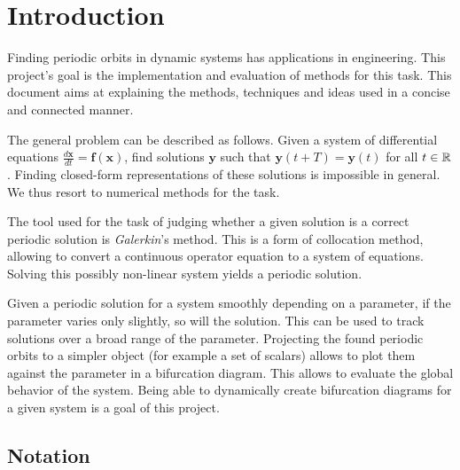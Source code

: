 \section{Introduction}


Finding periodic orbits in dynamic systems has applications in engineering. %
This project's goal is the implementation and evaluation of methods for this task.
This document aims at explaining the methods, techniques and ideas used in a concise and connected manner.

The general problem can be described as follows.
Given a system of differential equations $\frac{d \mathbf x}{dt} = \mathbf f(\mathbf x)$, find solutions $\mathbf y$ such that $\mathbf y(t+T) = \mathbf y(t)$ for all $t \in \mathbb{R}$.
Finding closed-form representations of these solutions is impossible in general.
We thus resort to numerical methods for the task.

The tool used for the task of judging whether a given solution is a correct periodic solution is \emph{Galerkin}'s method.
This is a form of collocation method, allowing to convert a continuous operator equation to a system of equations.
Solving this possibly non-linear system yields a periodic solution.

Given a periodic solution for a system smoothly depending on a parameter, if the parameter varies only slightly, so will the solution.
This can be used to track solutions over a broad range of the parameter.
Projecting the found periodic orbits to a simpler object (for example a set of scalars) allows to plot them against the parameter in a bifurcation diagram.
This allows to evaluate the global behavior of the system.
Being able to dynamically create bifurcation diagrams for a given system is a goal of this project.


\subsection{Notation}

